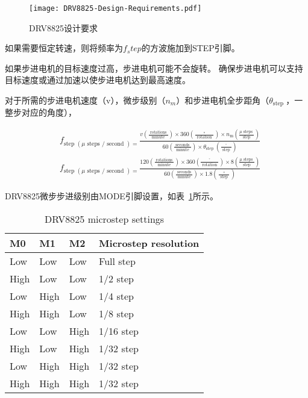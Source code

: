 \begin{figure}[htbp]
    \centering
    \texttt{[image: DRV8825-Design-Requirements.pdf]}
    \caption{DRV8825设计要求}
    \label{fig:DRV8825-Design-Requirements}
\end{figure}

如果需要恒定转速，则将频率为$f_step$的方波施加到STEP引脚。

如果步进电机的目标速度过高，步进电机可能不会旋转。 确保步进电机可以支持目标速度或通过加速以使步进电机达到最高速度。

对于所需的步进电机速度（v），微步级别（$n_m$）和步进电机全步距角（$\theta_{\text {step }}$，一整步对应的角度），

\begin{equation}
    \begin{aligned}
    &f_{\text {step }(\mu \text { steps } / \text { second })=} \frac{v\left(\frac{\text { rotations }}{\text { minute }}\right) \times 360\left(\frac{\circ}{\text { rotation }}\right) \times n_{\mathrm{m}}\left(\frac{\mu \text { steps }}{\text { step }}\right)}{60\left(\frac{\text { seconds }}{\text { minute }}\right) \times \theta_{\text {step }}\left(\frac{^{\circ}}{\text { step }}\right)}\\
    &f_{\text {step }(\mu \text { steps } / \text { second })=} \frac{120\left(\frac{\text { rotations }}{\text { minute }}\right) \times 360\left(\frac{^{\circ}}{\text { rotation }}\right) \times 8\left(\frac{\mu \text { steps }}{\text { step }}\right)}{60\left(\frac{\text { seconds }}{\text { minute }}\right) \times 1.8\left(\frac{\circ}{\text { step }}\right)}
    \end{aligned}
\end{equation}

DRV8825微步步进级别由MODE引脚设置，如表~\ref{tab:DRV8825-microstep-settings}所示。

\begin{table}[htbp]
    \centering
    \begin{tabular}{llll}
    \hline
    M0   & M1   & M2   & Microstep resolution \\ \hline
    Low  & Low  & Low  & Full step            \\ \hline
    High & Low  & Low  & 1/2 step             \\ \hline
    Low  & High & Low  & 1/4 step             \\ \hline
    High & High & Low  & 1/8 step             \\ \hline
    Low  & Low  & High & 1/16 step            \\ \hline
    High & Low  & High & 1/32 step            \\ \hline
    Low  & High & High & 1/32 step            \\ \hline
    High & High & High & 1/32 step            \\ \hline
    \end{tabular}
    \caption{DRV8825 microstep settings}
    \label{tab:DRV8825-microstep-settings}
\end{table}

